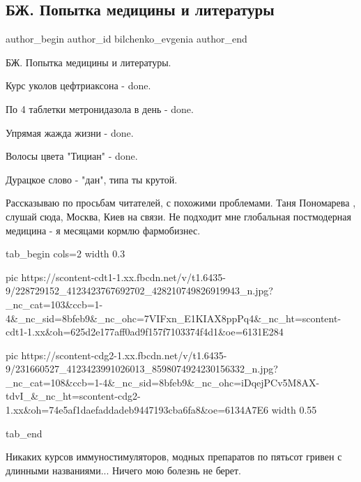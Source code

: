  
 
 
 
 
 
\subsection{БЖ. Попытка медицины и литературы}
\label{sec:05_08_2021.fb.bilchenko_evgenia.1.medicina_literatura}
 
\ifcmt
 author_begin
   author_id bilchenko_evgenia
 author_end
\fi

БЖ. Попытка медицины и литературы.

Курс уколов цефтриаксона - done.

По 4 таблетки метронидазола в день - done.

Упрямая жажда жизни - done.

Волосы цвета "Тициан" - done.

Дурацкое слово - "дан", типа ты крутой.

Рассказываю по просьбам читателей, с похожими проблемами. Таня Пономарева ,
слушай сюда, Москва, Киев на связи. Не подходит мне глобальная постмодерная
медицина - я месяцами кормлю фармобизнес. 

\ifcmt
  tab_begin cols=2
		width 0.3

     pic https://scontent-cdt1-1.xx.fbcdn.net/v/t1.6435-9/228729152_4123423767692702_428210749826919943_n.jpg?_nc_cat=103&ccb=1-4&_nc_sid=8bfeb9&_nc_ohc=7VIFxn_E1KIAX8ppPq4&_nc_ht=scontent-cdt1-1.xx&oh=625d2e177aff0ad9f157f7103374f4d1&oe=6131E284

     pic https://scontent-cdg2-1.xx.fbcdn.net/v/t1.6435-9/231660527_4123423991026013_8598074924230156332_n.jpg?_nc_cat=108&ccb=1-4&_nc_sid=8bfeb9&_nc_ohc=iDqejPCv5M8AX-tdvI_&_nc_ht=scontent-cdg2-1.xx&oh=74e5af1daefaddadeb9447193cba6fa8&oe=6134A7E6
		width 0.55

  tab_end
\fi

Никаких курсов иммуностимуляторов, модных препаратов по пятьсот гривен с
длинными названиями... Ничего мою болезнь не берет. 

